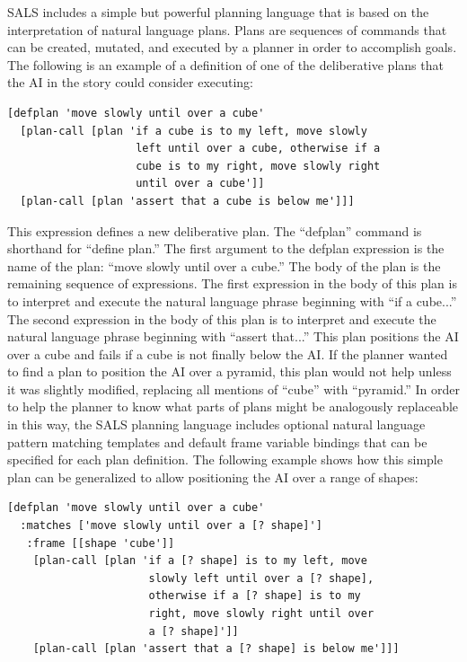 SALS includes a simple but powerful planning language that is based on
the interpretation of natural language plans.  Plans are sequences of
commands that can be created, mutated, and executed by a planner in
order to accomplish goals.  The following is an example of a
definition of one of the deliberative plans that the AI in the story
could consider executing:
\begin{samepage}
\begin{Verbatim}
[defplan 'move slowly until over a cube'
  [plan-call [plan 'if a cube is to my left, move slowly
                    left until over a cube, otherwise if a
                    cube is to my right, move slowly right
                    until over a cube']]
  [plan-call [plan 'assert that a cube is below me']]]
\end{Verbatim}
\end{samepage}
This expression defines a new deliberative plan.  The ``defplan''
command is shorthand for ``define plan.''  The first argument to the
defplan expression is the name of the plan: ``move slowly until over a
cube.''  The body of the plan is the remaining sequence of
expressions.  The first expression in the body of this plan is to
interpret and execute the natural language phrase beginning with ``if
a cube...''  The second expression in the body of this plan is to
interpret and execute the natural language phrase beginning with
``assert that...''  This plan positions the AI over a cube and fails
if a cube is not finally below the AI.  If the planner wanted to find
a plan to position the AI over a pyramid, this plan would not help
unless it was slightly modified, replacing all mentions of ``cube''
with ``pyramid.''  In order to help the planner to know what parts of
plans might be analogously replaceable in this way, the SALS planning
language includes optional natural language pattern matching templates
and default frame variable bindings that can be specified for each
plan definition.  The following example shows how this simple plan can
be generalized to allow positioning the AI over a range of shapes:
\begin{samepage}
\begin{Verbatim}
[defplan 'move slowly until over a cube'
  :matches ['move slowly until over a [? shape]']
   :frame [[shape 'cube']]
    [plan-call [plan 'if a [? shape] is to my left, move
                      slowly left until over a [? shape],
                      otherwise if a [? shape] is to my
                      right, move slowly right until over
                      a [? shape]']]
    [plan-call [plan 'assert that a [? shape] is below me']]]
\end{Verbatim}
\end{samepage}

